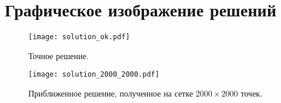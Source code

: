\section{Графическое изображение решений}

\begin{figure}[H]
    \centering
    \texttt{[image: solution\_ok.pdf]}
    \caption{Точное решение.}
    \label{fig:solution_ok}
\end{figure}

\begin{figure}[H]
    \centering
    \texttt{[image: solution\_2000\_2000.pdf]}
    \caption{Приближенное решение, полученное на сетке $2000 \times 2000$ точек.}
    \label{fig:solution_2000_2000}
\end{figure}

\clearpage

